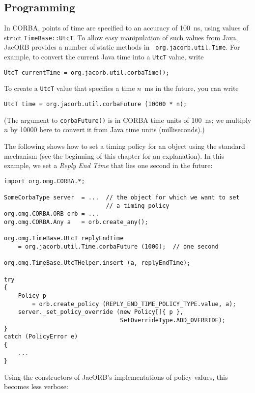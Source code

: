 \subsection*{Programming}

In CORBA, points of time are specified to an accuracy of 100~ns, using
values of struct {\tt TimeBase::UtcT}.  To allow easy manipulation of such
values from Java, JacORB provides a number of static methods in {\tt
org.jacorb.util.Time}.  For example, to convert the current Java time
into a {\tt UtcT} value, write

\begin{verbatim}
UtcT currentTime = org.jacorb.util.corbaTime();
\end{verbatim}

To create a {\tt UtcT} value that specifies a time $n$~ms in the
future, you can write

\begin{verbatim}
UtcT time = org.jacorb.util.corbaFuture (10000 * n);
\end{verbatim}

(The argument to {\tt corbaFuture()} is in CORBA time units of
100~ns; we multiply $n$ by 10000 here to convert it from Java time
units (milliseconds).)

The following shows how to set a timing policy for an object using the
standard mechanism (see the beginning of this chapter for an
explanation).  In this example, we set a \emph{Reply End Time} that
lies one second in the future:

\begin{verbatim}
import org.omg.CORBA.*;

SomeCorbaType server  = ...  // the object for which we want to set
                             // a timing policy
org.omg.CORBA.ORB orb = ...
org.omg.CORBA.Any a   = orb.create_any();

org.omg.TimeBase.UtcT replyEndTime
    = org.jacorb.util.Time.corbaFuture (1000);  // one second

org.omg.TimeBase.UtcTHelper.insert (a, replyEndTime);

try
{
    Policy p
        = orb.create_policy (REPLY_END_TIME_POLICY_TYPE.value, a);
    server._set_policy_override (new Policy[]{ p },
                                 SetOverrideType.ADD_OVERRIDE);
}
catch (PolicyError e)
{
    ...
}
\end{verbatim}

Using the constructors of JacORB's implementations of policy values,
this becomes less verbose:

